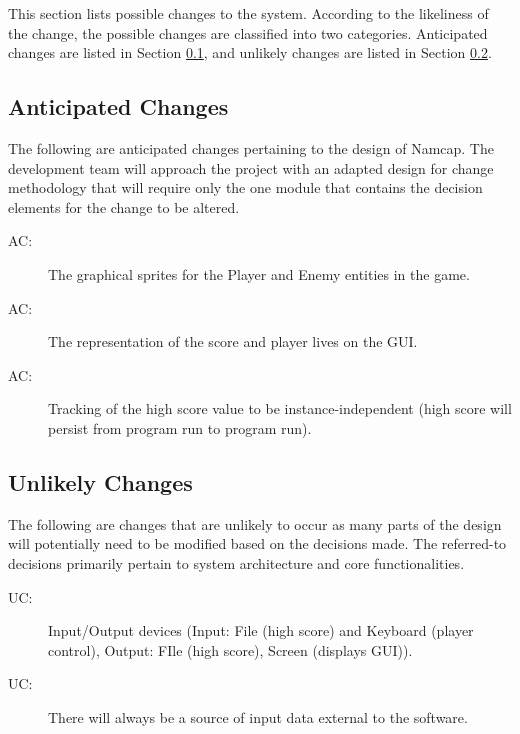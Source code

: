 \documentclass[12pt, titlepage]{article}
\newcounter{acnum}
\newcommand{\actheacnum}{AC\theacnum}
\newcounter{ucnum}
\newcommand{\uctheucnum}{UC\theucnum}
\begin{document}
This section lists possible changes to the system. According to the likeliness
of the change, the possible changes are classified into two
categories. Anticipated changes are listed in Section \ref{SecAchange}, and
unlikely changes are listed in Section \ref{SecUchange}.

\subsection{Anticipated Changes} \label{SecAchange}

The following are anticipated changes pertaining to the design of Namcap. The development team will approach the project with an adapted design for change methodology that will require only the one module that contains the decision elements for the change to be altered.

\begin{description}
\item[ \actheacnum \label{acSprites}:] The graphical sprites for the Player and Enemy entities in the game.
\item[ \actheacnum \label{acStats}:] The representation of the score and player lives on the GUI.
\item[ \actheacnum \label{acHScore}:] Tracking of the high score value to be instance-independent (high score will persist from program run to program run).
\end{description}

\subsection{Unlikely Changes} \label{SecUchange}

The following are changes that are unlikely to occur as many parts of the design will potentially need to be modified based on the decisions made. The referred-to decisions primarily pertain to system architecture and core functionalities.

\begin{description}
\item[ \uctheucnum \label{ucIO}:] Input/Output devices (Input: File (high score) and Keyboard (player control), Output: FIle (high score), Screen (displays GUI)).
\item[ \uctheucnum \label{ucInput}:] There will always be a source of input data external to the software.
\end{description}
\end{document}
